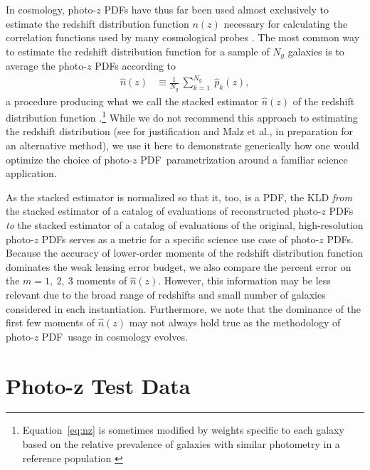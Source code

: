 \documentclass[\docopts]{\docclass}
\newcommand{\pz}{photo-$z$ PDF}
\begin{document}
In cosmology, \pz s have thus far been used almost exclusively to estimate the 
redshift distribution function $n(z)$ necessary for calculating the correlation 
functions used by many cosmological probes \citep{clampitt_galaxygalaxy_2017, 
hildebrandt_kids-450:_2017}.
The most common way to estimate the redshift distribution function for a sample 
of $N_{g}$ galaxies is to average the \pz s according to
\begin{align}
  \label{eq:nz}
  \hat{n}(z) &\equiv \frac{1}{N_{g}}\ \sum_{k=1}^{N_{g}}\ \hat{p}_{k}(z),
\end{align}
a procedure producing what we call the stacked estimator $\hat{n}(z)$ of the 
redshift distribution function \citep{harnois-deraps_kids-450:_2017, 
hoyle_dark_2017}.\footnote{
Equation~\ref{eq:nz} is sometimes modified by weights specific to each galaxy 
based on the relative prevalence of galaxies with similar photometry in a 
reference population \citep{sheldon_photometric_2012, 
troster_cross-correlation_2017}
}
While we do not recommend this approach to estimating the redshift distribution 
(see \citet{choi_cfhtlens_2016} for justification and Malz et al., in 
preparation for an alternative method), we use it here to demonstrate 
generically how one would optimize the choice of \pz\ parametrization around a 
familiar science application.

As the stacked estimator is normalized so that it, too, is a PDF, the KLD 
\textit{from} the stacked estimator of a catalog of evaluations of 
reconstructed \pz s \textit{to} the stacked estimator of a catalog of 
evaluations of the original, high-resolution \pz s serves as a metric for a 
specific science use case of \pz s.
Because the accuracy of lower-order moments of the redshift distribution 
function dominates the weak lensing error budget, we also compare the percent 
error on the $m=1,\ 2,\ 3$ moments of $\hat{n}(z)$.
However, this information may be less relevant due to the broad range of 
redshifts and small number of galaxies considered in each instantiation.
Furthermore, we note that the dominance of the first few moments of 
$\hat{n}(z)$ may not always hold true as the methodology of \pz\ usage in 
cosmology evolves.


\section{Photo-z Test Data}
\label{sec:data}
\end{document}
